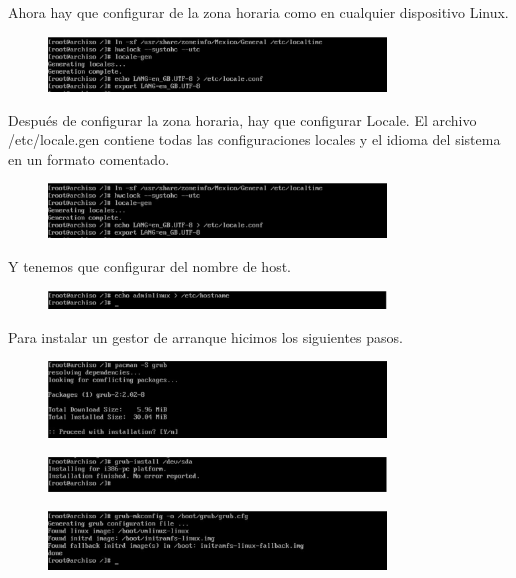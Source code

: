 \documentclass[11pt,letterpaper]{article}
\begin{document}
Ahora hay que configurar de la zona horaria como en cualquier dispositivo Linux.
\begin{figure}[H]
        \centering
        \includegraphics[width=0.8\textwidth]{img/19.png}
        \label{img:Imagen 4}
\end{figure}

Después de configurar la zona horaria, hay que configurar Locale. El archivo /etc/locale.gen contiene todas las configuraciones locales y el idioma del sistema en un formato comentado. 

\begin{figure}[H]
        \centering
        \includegraphics[width=0.8\textwidth]{img/20.png}
        \label{img:Imagen 4}
\end{figure}
Y tenemos que configurar del nombre de host.
\begin{figure}[H]
        \centering
        \includegraphics[width=0.8\textwidth]{img/21.png}
        \label{img:Imagen 4}
\end{figure}
Para instalar un gestor de arranque hicimos los siguientes pasos.
\begin{figure}[H]
        \centering
        \includegraphics[width=0.8\textwidth]{img/22.png}
        \label{img:Imagen 4}
\end{figure}
\begin{figure}[H]
        \centering
        \includegraphics[width=0.8\textwidth]{img/23.png}
        \label{img:Imagen 4}
\end{figure}
\begin{figure}[H]
        \centering
        \includegraphics[width=0.8\textwidth]{img/24.png}
        \label{img:Imagen 4}
\end{figure}
\end{document}
